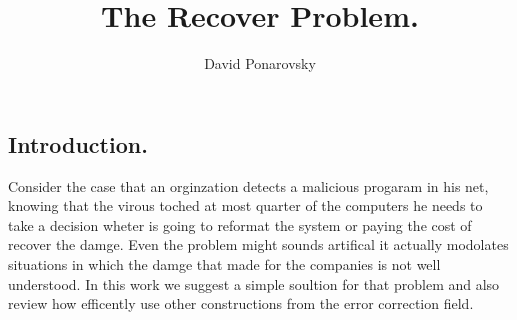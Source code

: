 

\title{ The Recover Problem.   } 
\author{David Ponarovsky}
\maketitle
{} 
\begin{multicols*}{2}

  \section{Introduction.} Consider the case that an orginzation detects a malicious progaram in his net, knowing that the virous toched at most quarter of the computers he needs to take a decision wheter is going to reformat the system or paying the cost of recover the damge. Even the problem might sounds artifical it actually modolates situations in which the damge that made for the companies is not well understood. In this work we suggest a simple soultion for that problem and also review how efficently use other constructions from the error correction field.       

\end{multicols*}

